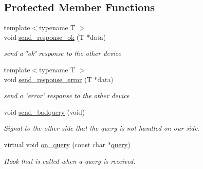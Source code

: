 \subsection*{Protected Member Functions}
\begin{DoxyCompactItemize}
\item 
{\footnotesize template$<$typename T $>$ }\\void \hyperlink{classInterQarpe_1_1DuplexBase_acf8055b4b74a31d87d2bb7f996bb70ad}{send\+\_\+response\+\_\+ok} (T $\ast$data)
\begin{DoxyCompactList}\small\item\em send a \char`\"{}ok\char`\"{} response to the other device \end{DoxyCompactList}\item 
{\footnotesize template$<$typename T $>$ }\\void \hyperlink{classInterQarpe_1_1DuplexBase_abb519576ef34c52b3f9f308ae8985fc4}{send\+\_\+response\+\_\+error} (T $\ast$data)
\begin{DoxyCompactList}\small\item\em send a \char`\"{}error\char`\"{} response to the other device \end{DoxyCompactList}\item 
\hypertarget{classInterQarpe_1_1DuplexBase_a897ceb69441859a534402332c366325f}{void \hyperlink{classInterQarpe_1_1DuplexBase_a897ceb69441859a534402332c366325f}{send\+\_\+badquery} (void)}\label{classInterQarpe_1_1DuplexBase_a897ceb69441859a534402332c366325f}

\begin{DoxyCompactList}\small\item\em Signal to the other side that the query is not handled on our side. \end{DoxyCompactList}\item 
\hypertarget{classInterQarpe_1_1DuplexBase_a0b2dc57b5951bd0d3a4b670ee860c496}{virtual void \hyperlink{classInterQarpe_1_1DuplexBase_a0b2dc57b5951bd0d3a4b670ee860c496}{on\+\_\+query} (const char $\ast$\hyperlink{classInterQarpe_1_1DuplexBase_a854f6b7c2a7a11bbd3e21b1db5cd8d6b}{query})}\label{classInterQarpe_1_1DuplexBase_a0b2dc57b5951bd0d3a4b670ee860c496}

\begin{DoxyCompactList}\small\item\em Hook that is called when a query is received. \end{DoxyCompactList}\end{DoxyCompactItemize}
